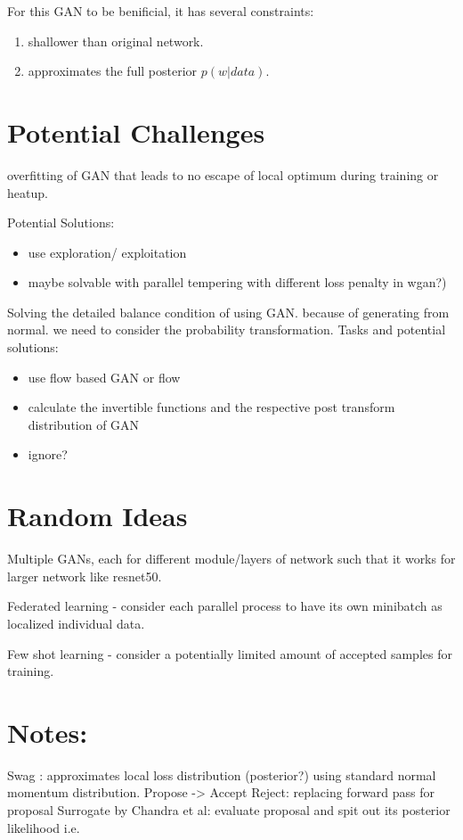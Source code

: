 \documentclass[honours,12pt]{unswthesis}
\numberwithin{equation}{section}
\begin{document}
For this GAN to be benificial, it has several constraints: 
\begin{enumerate}
    \item shallower than original network.
    \item approximates the full posterior $p(w|data)$.
\end{enumerate}

\section{Potential Challenges}
overfitting of GAN that leads to no escape of local optimum during training or heatup. 

Potential Solutions:
\begin{itemize}
\item use exploration/ exploitation 
\item maybe solvable with parallel tempering with different loss penalty in wgan?)
\end{itemize}

Solving the detailed balance condition of using GAN. because of generating from normal. we need to consider the probability transformation.
Tasks and potential solutions:
\begin{itemize}
\item use flow based GAN or flow
\item calculate the invertible functions and the respective post transform distribution of GAN
\item ignore?
\end{itemize}


\section{Random Ideas}
Multiple GANs, each for different module/layers of network such that it works for larger network like resnet50.

Federated learning - consider each parallel process to have its own minibatch as localized individual data.

Few shot learning - consider a potentially limited amount of accepted samples for training. 


\section{ Notes:}

Swag : approximates local loss distribution (posterior?) using standard normal momentum distribution.
Propose -> Accept Reject: replacing forward pass for proposal 
Surrogate by Chandra et al: evaluate proposal and spit out its posterior likelihood
    i.e. 
    
\end{document}
